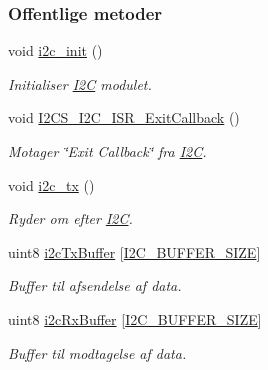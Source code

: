 \subsubsection*{Offentlige metoder}
\begin{DoxyCompactItemize}
\item 
void \hyperlink{class_i2_c_a64303230bf4843297e7ac37ac236ca04}{i2c\+\_\+init} ()
\begin{DoxyCompactList}\small\item\em Initialiser \hyperlink{class_i2_c}{I2C} modulet. \end{DoxyCompactList}\item 
void \hyperlink{class_i2_c_a1b75ff104f3614357d14cee6514ad108}{I2\+C\+S\+\_\+\+I2\+C\+\_\+\+I\+S\+R\+\_\+\+Exit\+Callback} ()
\begin{DoxyCompactList}\small\item\em Motager \char`\"{}\+Exit Callback\char`\"{} fra \hyperlink{class_i2_c}{I2C}. \end{DoxyCompactList}\item 
void \hyperlink{class_i2_c_a3d3187ad377a6ca29b3fac5c809b6012}{i2c\+\_\+tx} ()
\begin{DoxyCompactList}\small\item\em Ryder om efter \hyperlink{class_i2_c}{I2C}. \end{DoxyCompactList}\item 
uint8 \hyperlink{class_i2_c_a58ba88cddd7843f12a40a87c998f00da}{i2c\+Tx\+Buffer} \mbox{[}\hyperlink{i2c_8h_a6458dbf193a0eef0470fc1b08400bfcd}{I2\+C\+\_\+\+B\+U\+F\+F\+E\+R\+\_\+\+S\+I\+ZE}\mbox{]}
\begin{DoxyCompactList}\small\item\em Buffer til afsendelse af data. \end{DoxyCompactList}\item 
uint8 \hyperlink{class_i2_c_a711782550427eea544dabe5394d79a9b}{i2c\+Rx\+Buffer} \mbox{[}\hyperlink{i2c_8h_a6458dbf193a0eef0470fc1b08400bfcd}{I2\+C\+\_\+\+B\+U\+F\+F\+E\+R\+\_\+\+S\+I\+ZE}\mbox{]}
\begin{DoxyCompactList}\small\item\em Buffer til modtagelse af data. \end{DoxyCompactList}\end{DoxyCompactItemize}
